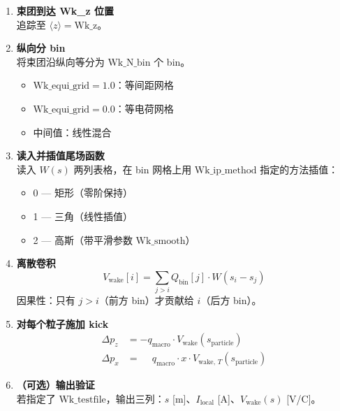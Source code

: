 \documentclass[a4paper,11pt]{article}
\begin{document}
\begin{enumerate}[label=\textbf{Step \arabic*:}, leftmargin=*]
  \item \textbf{束团到达 Wk\_z 位置} \\
        追踪至 $\langle z \rangle = \text{Wk\_z}$。

  \item \textbf{纵向分 bin} \\
        将束团沿纵向等分为 $\text{Wk\_N\_bin}$ 个 bin。
        \begin{itemize}
          \item $\text{Wk\_equi\_grid}=1.0$：等间距网格
          \item $\text{Wk\_equi\_grid}=0.0$：等电荷网格
          \item 中间值：线性混合
        \end{itemize}

  \item \textbf{读入并插值尾场函数} \\
        读入 $W(s)$ 两列表格，在 bin 网格上用 $\text{Wk\_ip\_method}$ 指定的方法插值：
        \begin{itemize}
          \item 0 — 矩形（零阶保持）
          \item 1 — 三角（线性插值）
          \item 2 — 高斯（带平滑参数 $\text{Wk\_smooth}$）
        \end{itemize}

  \item \textbf{离散卷积} \\
        \begin{equation}
          V_{\text{wake}}[i] = \sum_{j > i} Q_{\text{bin}}[j] \cdot W(s_i - s_j)
        \end{equation}
        因果性：只有 $j>i$（前方 bin）才贡献给 $i$（后方 bin）。

  \item \textbf{对每个粒子施加 kick} \\
        \begin{align}
          \Delta p_z &= -q_{\text{macro}} \cdot V_{\text{wake}}(s_{\text{particle}}) \label{eq:kick-long} \\
          \Delta p_x &= \phantom{-}q_{\text{macro}} \cdot x \cdot V_{\text{wake},\,T}(s_{\text{particle}}) \label{eq:kick-trans}
        \end{align}

  \item \textbf{（可选）输出验证} \\
        若指定了 $\text{Wk\_testfile}$，输出三列：$s$ [m]、$I_{\text{local}}$ [A]、$V_{\text{wake}}(s)$ [V/C]。
\end{enumerate}
\end{document}

